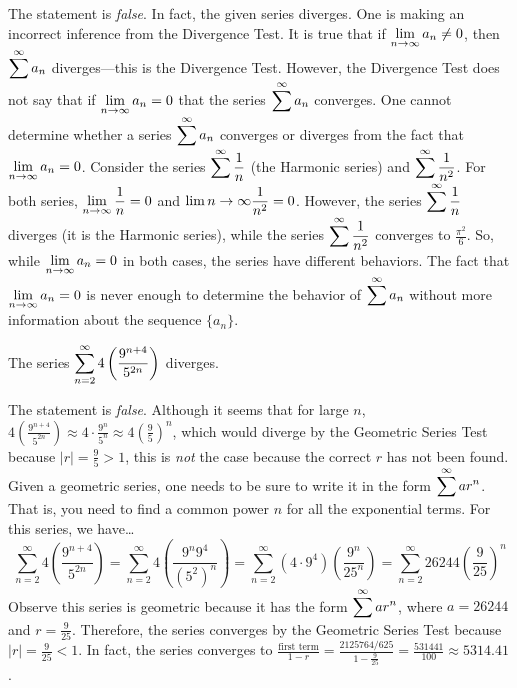 \documentclass[11pt,letterpaper]{article}
\begin{document}
\sol The statement is \textit{false}. In fact, the given series diverges. One is making an incorrect inference from the Divergence Test. It is true that if $\displaystyle\lim_{n \to \infty} a_n \neq 0$, then $\displaystyle\sum^\infty a_n$ diverges---this is the Divergence Test. However, the Divergence Test does not say that if $\displaystyle\lim_{n \to \infty} a_n = 0$ that the series $\displaystyle\sum^\infty a_n$ converges. One cannot determine whether a series $\displaystyle\sum^\infty a_n$ converges or diverges from the fact that $\displaystyle\lim_{n \to \infty} a_n = 0$. Consider the series $\displaystyle\sum^\infty \frac{1}{n}$ (the Harmonic series) and $\displaystyle\sum^\infty \frac{1}{n^2}$. For both series, $\displaystyle\lim_{n \to \infty} \frac{1}{n}= 0$ and $\displaystyle\lim{n \to \infty} \frac{1}{n^2}= 0$. However, the series $\displaystyle\sum^\infty \frac{1}{n}$ diverges (it is the Harmonic series), while the series $\displaystyle\sum^\infty \frac{1}{n^2}$ converges to $\frac{\pi^2}{6}$. So, while $\displaystyle\lim_{n \to \infty} a_n= 0$ in both cases, the series have different behaviors. The fact that $\displaystyle\lim_{n \to \infty} a_n= 0$ is never enough to determine the behavior of $\displaystyle\sum^\infty a_n$ without more information about the sequence $\{ a_n \}$. \pvspace{1.3cm}



 The series $\displaystyle\sum_{n=2}^\infty 4 \left( \dfrac{9^{n+4}}{5^{2n}} \right)$ diverges. \pspace

\sol The statement is \textit{false}. Although it seems that for large $n$, $4 \left( \frac{9^{n+4}}{5^{2n}} \right) \approx 4 \cdot \frac{9^n}{5^n} \approx 4 \left( \frac{9}{5} \right)^n$, which would diverge by the Geometric Series Test because $|r|= \frac{9}{5} > 1$, this is \textit{not} the case because the correct $r$ has not been found. Given a geometric series, one needs to be sure to write it in the form $\displaystyle\sum^\infty a r^n$. That is, you need to find a common power $n$ for all the exponential terms. For this series, we have\dots
	\[
	\sum_{n=2}^\infty 4 \left( \dfrac{9^{n+4}}{5^{2n}} \right)= \sum_{n=2}^\infty 4 \left( \dfrac{9^n 9^4}{(5^2)^n} \right)= \sum_{n=2}^\infty (4 \cdot 9^4) \left( \dfrac{9^n}{25^n} \right)= \sum_{n=2}^\infty 26244 \left( \dfrac{9}{25} \right)^n
	\]
Observe this series is geometric because it has the form $\displaystyle\sum^\infty ar^n$, where $a= 26244$ and $r= \frac{9}{25}$. Therefore, the series converges by the Geometric Series Test because $|r|= \frac{9}{25} < 1$. In fact, the series converges to $\frac{\text{first term}}{1 - r}= \frac{2125764/625}{1 - \frac{9}{25}}= \frac{531441}{100} \approx 5314.41$. \pvspace{1.3cm}
\end{document}
